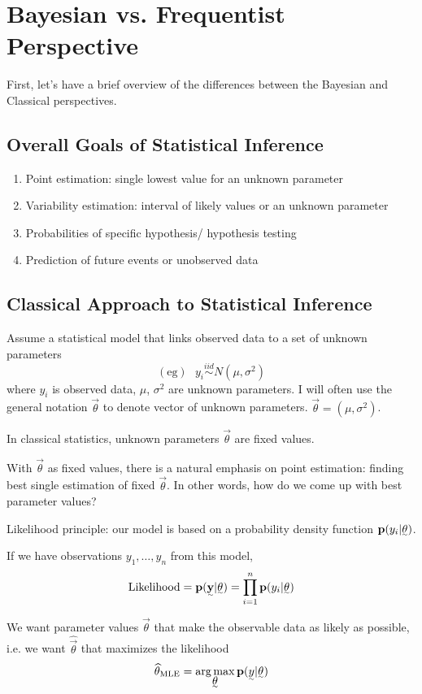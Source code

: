 \section{Bayesian vs. Frequentist Perspective}

First, let's have a brief overview of the differences between the Bayesian and Classical perspectives.

\subsection{Overall Goals of Statistical Inference}

\begin{enumerate}
    \item Point estimation: single lowest value for an unknown parameter
    \item Variability estimation: interval of likely values or an unknown parameter
    \item Probabilities of specific hypothesis/ hypothesis testing
    \item Prediction of future events or unobserved data
\end{enumerate}

\subsection{Classical Approach to Statistical Inference}

Assume a statistical model that links observed data to a set of unknown parameters
\[
(\text{eg}) ~~~ y_i \stackrel{iid}{\sim}  N(\mu, \sigma^2)
\]
where $y_i$ is observed data, $\mu$, $\sigma^2$ are unknown parameters. I will often use the general notation $\vec{\theta}$ to denote vector of unknown parameters. $\vec{\theta} = (\mu, \sigma^2)$.

In classical statistics, unknown parameters $\vec{\theta}$ are fixed values.

With $\vec{\theta}$ as fixed values, there is a natural emphasis on point estimation: finding best single estimation of fixed $\vec{\theta}$. In other words, how do we come up with best parameter values?

Likelihood principle: our model is based on a probability density function $\p(y_i| \vec{\theta})$.

If we have observations $y_1, \dots, y_n$ from this model, 
\[
\text{Likelihood} = \p(\vec{\y}| \vec{\theta}) = \prod_{i=1}^n \p(y_i| \vec{\theta})
\]

We want parameter values $\vec{\theta}$ that make the observable data as likely as possible, i.e. we want $\hat{\vec{\theta}}$ that maximizes the likelihood
\[
\hat{\theta}_\text{MLE} = \argmax_{\vec{\theta}} \p(\vec{y} | \vec{\theta})
\]

